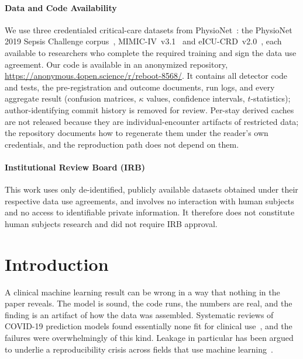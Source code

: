 \documentclass[pmlr,twocolumn,10pt]{jmlr}
\begin{document}
\paragraph*{Data and Code Availability}
We use three credentialed critical-care datasets from
PhysioNet~\citep{goldberger2000physiobank}: the PhysioNet 2019 Sepsis Challenge
corpus~\citep{reyna2020early}, MIMIC-IV~v3.1~\citep{johnson2023mimiciv} and
eICU-CRD~v2.0~\citep{pollard2018eicu}, each available to researchers who
complete the required training and sign the data use agreement. Our code is
available in an anonymized repository, \url{https://anonymous.4open.science/r/reboot-8568/}. It
contains all detector code and tests, the pre-registration and outcome
documents, run logs, and every aggregate result (confusion matrices, $\kappa$
values, confidence intervals, $t$-statistics); author-identifying commit history
is removed for review. Per-stay derived caches are not released because they are
individual-encounter artifacts of restricted data; the repository documents how
to regenerate them under the reader's own credentials, and the reproduction path
does not depend on them.

\paragraph*{Institutional Review Board (IRB)}
This work uses only de-identified, publicly available datasets obtained under
their respective data use agreements, and involves no interaction with human
subjects and no access to identifiable private information. It therefore does
not constitute human subjects research and did not require IRB approval.
\fi

\section{Introduction}
\label{sec:intro}

A clinical machine learning result can be wrong in a way that nothing in the
paper reveals. The model is sound, the code runs, the numbers are real, and the
finding is an artifact of how the data was assembled. Systematic reviews of
COVID-19 prediction models found essentially none fit for clinical
use~\citep{wynants2020prediction,roberts2021common}, and the failures were
overwhelmingly of this kind. Leakage in particular has been argued to underlie a
reproducibility crisis across fields that use machine
learning~\citep{kapoor2023leakage}.
\end{document}
